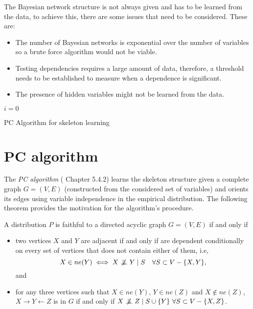 
The Bayesian network structure is not always given and has to be learned from the data, to achieve this, there are some issues that need to be considered. These are:
\begin{itemize}\setlength{\itemsep}{0.15cm}
  \item The number of Bayesian networks is exponential over the number of variables so a brute force algorithm would not be viable.
  \item Testing dependencies requires a large amount of data, therefore, a threshold needs to be established to measure when a dependence is significant.
  \item The presence of hidden variables might not be learned from the data.
\end{itemize}


\begin{algorithm}[t]
  \SetAlgoLined{}
  \(i = 0\)\;
  \caption{PC Algorithm for skeleton learning}\label{alg:pc}
\end{algorithm}

\section{PC algorithm}

The \emph{PC algorithm} (\cite{spirtes2000causation} Chapter 5.4.2) learns the skeleton structure given a complete graph \(G=(V,E)\) (constructed from the considered set of variables) and orients its edges using variable independence in the empirical distribution. The following theorem provides the motivation for the algorithm's procedure.

\begin{theorem}
  A distribution \(P\) is faithful to a directed acyclic graph \(G = (V,E)\)  if and only if
  \begin{itemize}
    \item two vertices \(X\) and \(Y\) are adjacent if and only if are dependent conditionally on every set of vertices that does not contain either of them, i.e,
      \[
      X \in ne(Y) \iff X \bigCD Y \mid S \quad \forall S \subset V - \{X,Y\},
      \]
      and
    \item for any three vertices such that \(X \in ne(Y)\), \(Y \in ne(Z)\) and \(X \notin ne(Z)\),  \(X \to Y \leftarrow Z\) is in \(G\) if and only if \(X \bigCD Z \mid S\cup \{Y\} \ \forall S \subset V - \{X,Z\}\).
  \end{itemize}

\end{theorem}

